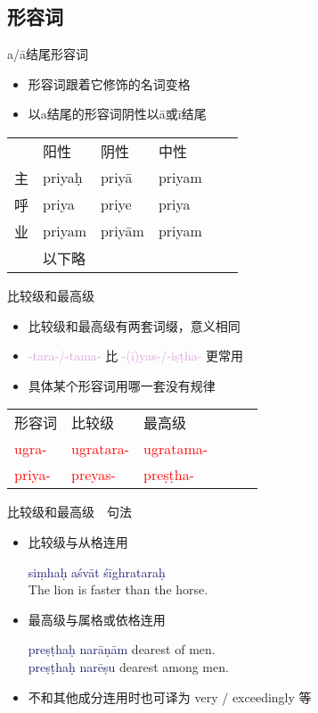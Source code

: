 \documentclass[17pt]{beamer}
\newcommand{\nounstem}[1]{\textcolor{red}{#1\nobreakdash-}}
\newcommand{\fullpada}[1]{\textcolor{OliveGreen}{#1}}
\newcommand{\pratyaya}[1]{\textcolor{Plum}{#1}}
\newcommand{\fullsentence}[1]{\textcolor{MidnightBlue}{#1}}
\begin{document}
\subsection{形容词}
\begin{frame}{a/ā结尾形容词}
  \small
  \begin{itemize}
    \item 形容词跟着它修饰的名词变格
    
    \item 以a结尾的形容词阴性以ā或ī结尾
  \end{itemize}
  \centering
    \begin{tabular}{@{}llllll@{}} %
       & 阳性 & 阴性 & 中性  \\
      主 & \fullpada{priyaḥ}  & \fullpada{priyā} & \fullpada{priyam}   \\
      呼 & \fullpada{priya} & \fullpada{priye} & \fullpada{priya} \\
      业 & \fullpada{priyam} & \fullpada{priyām} & \fullpada{priyam} \\
       & 以下略 &  &  \\
    \end{tabular}
\end{frame}

\begin{frame}{比较级和最高级}
  \small
  \begin{itemize}
    \item 比较级和最高级有两套词缀，意义相同  
    \item \pratyaya{\nobreakdash-tara\nobreakdash-/\nobreakdash-tama\nobreakdash-} 比 \pratyaya{\nobreakdash-(ī)yas\nobreakdash-/\nobreakdash-iṣṭha\nobreakdash-} 更常用
    \item 具体某个形容词用哪一套没有规律
  \end{itemize}
  \centering
    \begin{tabular}{@{}llllll@{}} %
      形容词 & 比较级 & 最高级  \\
      \nounstem{ugra}  & \nounstem{ugratara} & \nounstem{ugratama}   \\
      \nounstem{priya} & \nounstem{preyas} & \nounstem{preṣṭha} \\
    \end{tabular}
\end{frame}

\begin{frame}{比较级和最高级~~句法}
  \small
  \begin{itemize}
    \item 比较级与从格连用 
    
    \fullsentence{siṃhaḥ aśvāt śīghrataraḥ} \\The lion is faster than the horse.
    \item 最高级与属格或依格连用
    
    \fullsentence{preṣṭhaḥ narāṇām} dearest of men.\\
    \fullsentence{preṣṭhaḥ narēṣu} dearest among men.
    \item 不和其他成分连用时也可译为 very / exceedingly 等
  \end{itemize}
\end{frame}
\end{document}
